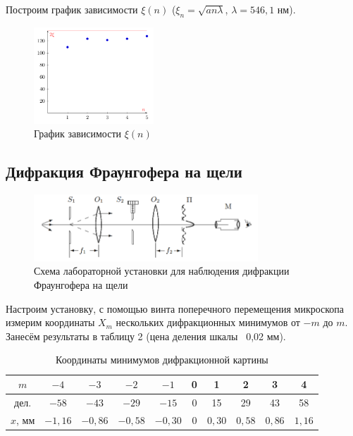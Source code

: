 \documentclass[a4paper]{article}
\begin{document}
\noindent Построим график зависимости $\xi (n)$ ($\xi_{n} = \sqrt{an\lambda}$, $\lambda = 546,1$ нм).

\begin{figure}[ht!]
    \centering
    \includegraphics[width = 0.40\textwidth]{image/pic4.png}
    \caption{График зависимости $\xi (n)$}
\end{figure}

\subsection{Дифракция Фраунгофера на щели}

\begin{figure}[ht!]
    \centering
    \includegraphics[width = 0.75\textwidth]{image/pic2.png}
    \caption{Схема лабораторной установки для наблюдения дифракции Фраунгофера на щели}
\end{figure}

\noindent Настроим установку, с помощью винта поперечного перемещения микроскопа измерим координаты
$X_m$ нескольких дифракционных минимумов от $-m$ до $m$. Занесём результаты в таблицу 2 (цена
деления шкалы ~0,02 мм).

\begin{table}[ht!]
    \centering
    \caption{Координаты минимумов дифракционной картины}
    \begin{tabular}{|c|c|c|c|c|c|c|c|c|c|}
    \hline
    $m$     & $-4$    & $-3$    & $-2$    & $-1$    & 0 & 1    & 2    & 3    & 4    \\ \hline
    дел.    & $-58$   & $-43$   & $-29$   & $-15$   & 0 & 15   & 29   & 43   & 58   \\ \hline
    $x$, мм & $-1,16$ & $-0,86$ & $-0,58$ & $-0,30$ & 0 & $0,30$ & $0,58$ & $0,86$ & $1,16$ \\ \hline
    \end{tabular}
    \end{table}
\end{document}

